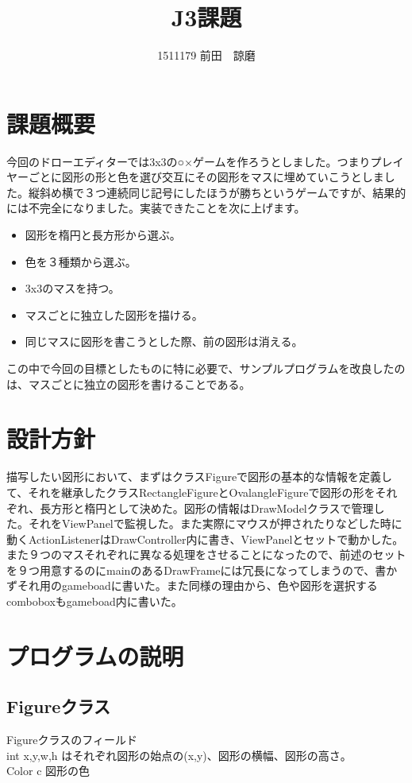 \documentclass[12pt, a4paper, titlepage]{jsarticle}
\begin{document}
\begin{titlepage}
\title{J3課題}
\author{1511179  前田　諒磨}
\maketitle
\end{titlepage}
\section{課題概要}
今回のドローエディターでは3x3の○×ゲームを作ろうとしました。つまりプレイヤーごとに図形の形と色を選び交互にその図形をマスに埋めていこうとしました。縦斜め横で３つ連続同じ記号にしたほうが勝ちというゲームですが、結果的には不完全になりました。実装できたことを次に上げます。
\begin{itemize}
\item 図形を楕円と長方形から選ぶ。
\item 色を３種類から選ぶ。
\item 3x3のマスを持つ。
\item マスごとに独立した図形を描ける。
\item 同じマスに図形を書こうとした際、前の図形は消える。
\end{itemize}
この中で今回の目標としたものに特に必要で、サンプルプログラムを改良したのは、マスごとに独立の図形を書けることである。
\section{設計方針}
描写したい図形において、まずはクラスFigureで図形の基本的な情報を定義して、それを継承したクラスRectangleFigureとOvalangleFigureで図形の形をそれぞれ、長方形と楕円として決めた。図形の情報はDrawModelクラスで管理した。それをViewPanelで監視した。また実際にマウスが押されたりなどした時に動くActionListenerはDrawController内に書き、ViewPanelとセットで動かした。また９つのマスそれぞれに異なる処理をさせることになったので、前述のセットを９つ用意するのにmainのあるDrawFrameには冗長になってしまうので、書かずそれ用のgameboadに書いた。また同様の理由から、色や図形を選択するcomboboxもgameboad内に書いた。
\section{プログラムの説明}
\subsection{Figureクラス}
Figureクラスのフィールド\\
int x,y,w,h はそれぞれ図形の始点の(x,y)、図形の横幅、図形の高さ。\\
Color c 図形の色
\end{document}
